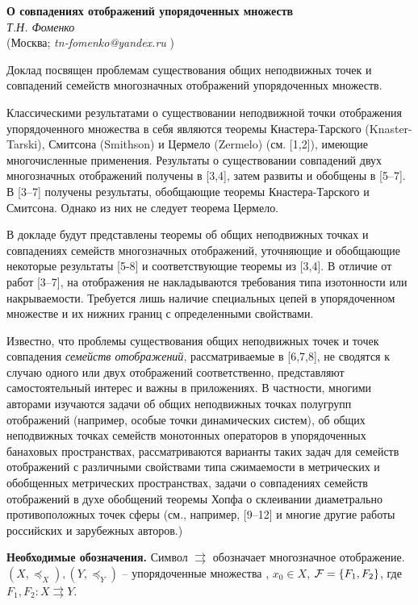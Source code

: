 \begin{center}{ \bf О совпадениях отображений упорядоченных множеств}\\
{\it Т.Н. Фоменко} \\
(Москва; {\it tn-fomenko@yandex.ru} )
\end{center}

Доклад посвящен проблемам существования общих неподвижных точек и совпадений семейств многозначных отображений упорядоченных множеств.

Классическими результатами о существовании неподвижной точки отображения упорядоченного множества в себя являются теоремы Кна\-стера-Тарского (Knaster-Tarski), Смитсона (Smithson) и Цермело (Zer\-melo) (см. [1,2]), имеющие многочисленные применения. Результаты о существовании совпадений двух многозначных отображений получены в [3,4], затем развиты и обобщены  в [5--7]. В  [3--7] получены результаты, обобщающие теоремы Кнастера-Тарского и Смитсона. Однако из них не следует теорема Цермело.

В докладе будут представлены теоремы об общих неподвижных точках и совпадениях семейств многозначных отображений, уточняющие и обобщающие некоторые результаты [5-8] и  соответствующие теоремы из [3,4]. В отличие от  работ [3--7],  на отображения не накладываются требования типа изотонности или накрываемости. Требуется лишь наличие специальных цепей в упорядоченном множестве и их нижних границ с определенными свойствами.

Известно, что проблемы существования  общих неподвижных точек и точек совпадения {\it семейств отображений}, рассматриваемые в [6,7,8],  не сводятся к случаю  одного или двух отображений соответственно, представляют самостоятельный интерес и важны в приложениях. В частности, многими авторами изучаются задачи об общих неподвижных точках  полугрупп отображений (например, особые точки динамических систем), об общих неподвижных точках семейств  монотонных операторов в упорядоченных банаховых пространствах, рассматриваются  варианты таких задач для семейств отображений с различными свойствами типа сжимаемости в метрических и обобщенных метрических пространствах, задачи о совпадениях семейств отображений в духе обобщений теоремы Хопфа о склеивании диаметрально противоположных точек сферы (см., например,  [9--12] и многие другие работы российских и зарубежных авторов.)

{\bf Необходимые обозначения.} Сим\-вол  $\rightrightarrows$  обозначает многозначное отображение. $(X,\preceq_{X}), (Y,\preceq_{Y})$ -- упорядоченные множества , $x_{0}\in X$, ${\cal F}=\{F_{1},F_{2}\}$, где
$F_{1},F_{2}: X\rightrightarrows Y$.

